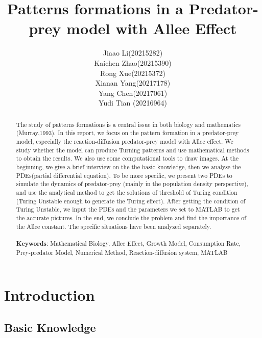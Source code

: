 \documentclass[12pt]{article}
\title{Patterns formations in a Predator-prey model with Allee Effect}
\author{Jiaao Li(20215282)\\
Kaichen Zhao(20215390)\\
Rong Xue(20215372)\\
Xianan Yang(20217178)\\
Yang Chen(20217061)\\
Yudi Tian (20216964)}
\begin{document}
\maketitle

\begin{abstract}
\noindent The study of patterns formations is a central issue in both biology and mathematics (Murray,1993). In this report, we focus on the pattern formation in a predator-prey model, especially the reaction-diffusion predator-prey model with Allee effect. We study whether the model can produce Turning patterns and use mathematical methods to obtain the results. We also use some computational tools to draw images. At the beginning, we give a brief interview on the the basic knowledge, then we analyse the PDEs(partial differential equation). To be more specific, we present two PDEs to simulate the dynamics of predator-prey (mainly in the population density perspective), and use the analytical method to get the solutions of threshold of Turing condition (Turing Unstable enough to generate the Turing effect). After getting the condition of Turing Unstable, we input the PDEs and the parameters we set to MATLAB to get the accurate pictures. In the end, we conclude the problem and find the importance of the Allee constant. The specific situations have been analyzed separately.
\\ \hspace*{\fill} \\
\textbf{Keywords}: Mathematical Biology, Allee Effect, Growth Model, Consumption Rate, Prey-predator Model, Numerical Method, Reaction-diffusion system, MATLAB
\end{abstract}


\thispagestyle{empty}
\newpage
\tableofcontents
\setcounter{page}{1}
\newpage



\section{Introduction}
\subsection{Basic Knowledge}
\end{document}
